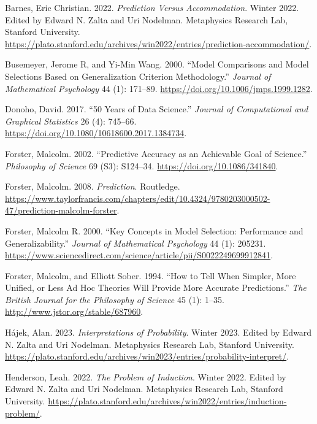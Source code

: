 \documentclass[
  letterpaper,
  DIV=11,
  numbers=noendperiod]{scrartcl}
\newlength{\cslhangindent}
\newenvironment{CSLReferences}[2] %
 {\begin{list}{}{%
  \setlength{\itemindent}{0pt}
  \setlength{\leftmargin}{0pt}
  \setlength{\parsep}{0pt}
  \ifodd #1
   \setlength{\leftmargin}{\cslhangindent}
   \setlength{\itemindent}{-1\cslhangindent}
  \fi
  \setlength{\itemsep}{#2\baselineskip}}}
 {\end{list}}
\theoremstyle{definition}
\theoremstyle{remark}
\begin{document}
\protect{}\label{refs}
\begin{CSLReferences}{1}{1}
Barnes, Eric Christian. 2022. \emph{Prediction Versus Accommodation}.
Winter 2022. Edited by Edward N. Zalta and Uri Nodelman. Metaphysics
Research Lab, Stanford University.
\url{https://plato.stanford.edu/archives/win2022/entries/prediction-accommodation/}.

Busemeyer, Jerome R, and Yi-Min Wang. 2000. {``Model Comparisons and
Model Selections Based on Generalization Criterion Methodology.''}
\emph{Journal of Mathematical Psychology} 44 (1): 171--89.
\url{https://doi.org/10.1006/jmps.1999.1282}.

Donoho, David. 2017. {``50 Years of Data Science.''} \emph{Journal of
Computational and Graphical Statistics} 26 (4): 745--66.
\url{https://doi.org/10.1080/10618600.2017.1384734}.

Forster, Malcolm. 2002. {``Predictive Accuracy as an Achievable Goal of
Science.''} \emph{Philosophy of Science} 69 (S3): S124--34.
\url{https://doi.org/10.1086/341840}.

Forster, Malcolm. 2008. \emph{Prediction}. Routledge.
\url{https://www.taylorfrancis.com/chapters/edit/10.4324/9780203000502-47/prediction-malcolm-forster}.

Forster, Malcolm R. 2000. {``Key Concepts in Model Selection:
Performance and Generalizability.''} \emph{Journal of Mathematical
Psychology} 44 (1): 205231.
\url{https://www.sciencedirect.com/science/article/pii/S0022249699912841}.

Forster, Malcolm, and Elliott Sober. 1994. {``How to Tell When Simpler,
More Unified, or Less Ad Hoc Theories Will Provide More Accurate
Predictions.''} \emph{The British Journal for the Philosophy of Science}
45 (1): 1--35. \url{http://www.jstor.org/stable/687960}.

Hájek, Alan. 2023. \emph{Interpretations of Probability}. Winter 2023.
Edited by Edward N. Zalta and Uri Nodelman. Metaphysics Research Lab,
Stanford University.
\url{https://plato.stanford.edu/archives/win2023/entries/probability-interpret/}.

Henderson, Leah. 2022. \emph{The Problem of Induction}. Winter 2022.
Edited by Edward N. Zalta and Uri Nodelman. Metaphysics Research Lab,
Stanford University.
\url{https://plato.stanford.edu/archives/win2022/entries/induction-problem/}.


\end{CSLReferences}
\end{document}
